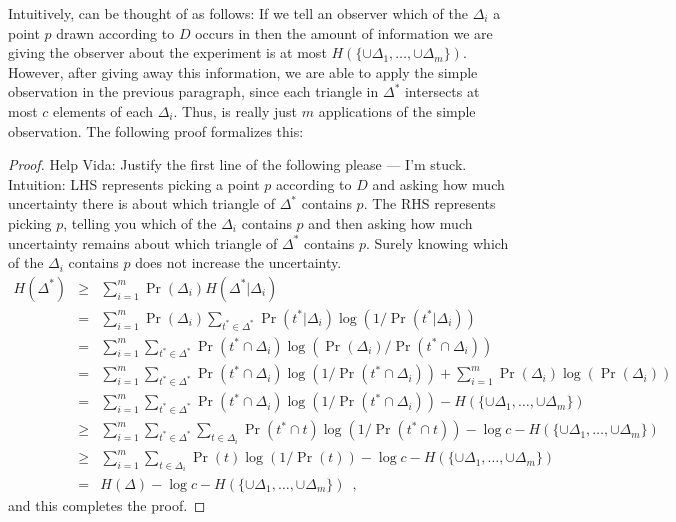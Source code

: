 \documentclass[lotsofwhite]{patmorin}
\begin{document}
Intuitively,  can be thought of as follows:  If we tell
an observer which of the $\Delta_i$ a point $p$ drawn according to $D$
occurs in then the amount of information we are giving the observer
about the experiment is at most
$H(\{\cup\Delta_1,\ldots,\cup\Delta_m\})$.  However, after giving away
this information, we are able to apply the simple observation in the
previous paragraph, since each triangle in $\Delta^*$ intersects at
most $c$ elements of each $\Delta_i$.  Thus,  is really
just $m$ applications of the simple observation.  The following proof
formalizes this:

\begin{proof} Help Vida: Justify the first line of the following please 
--- I'm stuck.
Intuition: LHS represents picking a point $p$ according to $D$ and
asking how much uncertainty there is about which triangle of
$\Delta^*$ contains $p$.  The RHS represents picking $p$, telling you
which of the $\Delta_i$ contains $p$ and then asking how much
uncertainty remains about which triangle of $\Delta^*$ contains $p$.
Surely knowing which of the $\Delta_i$ contains $p$ does not increase
the uncertainty.
\begin{eqnarray*}
   H(\Delta^*) 
     & \ge & \sum_{i=1}^m \Pr(\Delta_i)H(\Delta^*|\Delta_i) \\
     &  =  & \sum_{i=1}^m \Pr(\Delta_i)\sum_{t^*\in\Delta^*}
       \Pr(t^*|\Delta_i)\log(1/\Pr(t^*|\Delta_i)) \\
     &  =  & \sum_{i=1}^m \sum_{t^*\in\Delta^*}
       \Pr(t^*\cap\Delta_i)\log(\Pr(\Delta_i)/\Pr(t^*\cap\Delta_i)) \\
     &  =  & \sum_{i=1}^m \sum_{t^*\in\Delta^*}
       \Pr(t^*\cap\Delta_i)\log(1/\Pr(t^*\cap\Delta_i)) 
        + \sum_{i=1}^m \Pr(\Delta_i)\log(\Pr(\Delta_i)) \\
     &  =  & \sum_{i=1}^m \sum_{t^*\in\Delta^*}
       \Pr(t^*\cap\Delta_i)\log(1/\Pr(t^*\cap\Delta_i)) 
        - H(\{\cup\Delta_1,\ldots,\cup\Delta_m\}) \\
     & \ge  & \sum_{i=1}^m \sum_{t^*\in\Delta^*}\sum_{t\in\Delta_i}
       \Pr(t^*\cap t)\log(1/\Pr(t^*\cap t)) 
        -\log c - H(\{\cup\Delta_1,\ldots,\cup\Delta_m\}) \\
     & \ge  & \sum_{i=1}^m \sum_{t\in\Delta_i}
       \Pr(t)\log(1/\Pr(t)) 
        -\log c - H(\{\cup\Delta_1,\ldots,\cup\Delta_m\}) \\
     &  =  & H(\Delta) -\log c - H(\{\cup\Delta_1,\ldots,\cup\Delta_m\}) 
            \enspace ,
\end{eqnarray*}
and this completes the proof.
\end{proof}
\end{document}
